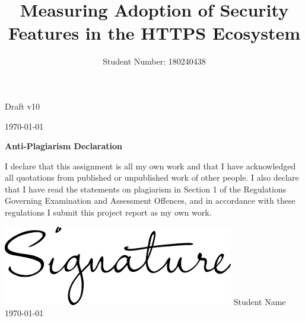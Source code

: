 \documentclass{mscreport}
\begin{document}

\vspace*{\fill}
\begin{center}
\begin{huge}
Draft v10

\vspace{3cm}
\today
\end{huge}
\end{center}
\vspace{\fill}

\newpage


\author{Student Number: 180240438	}
\title{Measuring Adoption of Security Features in the HTTPS Ecosystem}

\maketitle 


\begin{center}
    {\Large\bfseries Anti-Plagiarism Declaration}
    \vspace{1cm}
\begin{enumerate}

I declare that this assignment is all my own work and that I have acknowledged all quotations from published or unpublished work of other people.  I also declare that I have read the statements on plagiarism in Section 1 of the Regulations Governing Examination and Assessment Offences, and in accordance with these regulations I submit this project report as my own work.

\begin{flushleft}
\includegraphics[scale=0.21]{../images/signature.png} %
\newline
  \begingroup
    \noindent\textsf{Student Name} \vspace{0.5cm}\\
    \noindent\textsf{\today}
  \endgroup
  \end{flushleft}

\end{enumerate}
\end{center}
\end{document}
